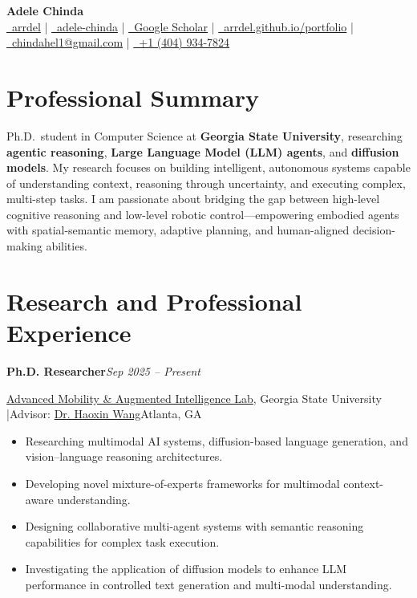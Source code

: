 \documentclass[a4paper,11pt]{article}
\newenvironment{experience}[4]
  {\noindent\textbf{\large #1}\hfill\textit{#2}\par
   \noindent\small\color{subtle}#3\hfill\color{subtle}#4\par\vspace{3pt}
   \begin{itemize}[leftmargin=1.2em,itemsep=3pt,topsep=2pt]}
  {\end{itemize}\vspace{8pt}}
\begin{document}
\pagestyle{empty}

\begin{center}
    {\Huge\bfseries\sffamily Adele Chinda}\\[8pt]
    \small
    \color{accent}
    \href{https://github.com/arrdel}{\faGithub\ arrdel} \enskip|\enskip
    \href{https://linkedin.com/in/adele-chinda}{\faLinkedin\ adele-chinda} \enskip|\enskip
    \href{https://scholar.google.com/citations?user=T6qXvdAAAAAJ&hl=en}{\faGraduationCap\ Google Scholar} \enskip|\enskip
    \href{https://arrdel.github.io/portfolio}{\faGlobe\ arrdel.github.io/portfolio} \enskip|\enskip
    \href{mailto:chindahel1@gmail.com}{\faEnvelope\ chindahel1@gmail.com} \enskip|\enskip
    \href{tel:+14049347824}{\faMobile\ +1 (404) 934-7824}
\end{center}

\vspace{8pt}

\section*{Professional Summary}

Ph.D.\ student in Computer Science at \textbf{Georgia State University}, researching \textbf{agentic reasoning}, \textbf{Large Language Model (LLM) agents}, and \textbf{diffusion models}.
My research focuses on building intelligent, autonomous systems capable of understanding context, reasoning through uncertainty, and executing complex, multi-step tasks.
I am passionate about bridging the gap between high-level cognitive reasoning and low-level robotic control---empowering embodied agents with spatial-semantic memory, adaptive planning, and human-aligned decision-making abilities.

\section*{Research and Professional Experience}

\begin{experience}
  {Ph.D. Researcher}{Sep 2025 -- Present}
  {\href{https://www.amai-gsu.us/}{Advanced Mobility \& Augmented Intelligence Lab}, Georgia State University \enspace|\enspace Advisor: \href{https://www.amai-gsu.us/group/}{Dr. Haoxin Wang}}{Atlanta, GA}
  \item Researching multimodal AI systems, diffusion-based language generation, and vision--language reasoning architectures.
  \item Developing novel mixture-of-experts frameworks for multimodal context-aware understanding.
  \item Designing collaborative multi-agent systems with semantic reasoning capabilities for complex task execution.
  \item Investigating the application of diffusion models to enhance LLM performance in controlled text generation and multi-modal understanding.
\end{experience}
\end{document}
